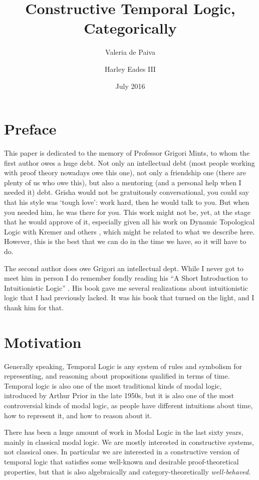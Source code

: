 \documentclass{article}
\title{Constructive Temporal Logic, Categorically}
\author{Valeria de Paiva \and Harley Eades III}
\date{July 2016}
\begin{document}
\maketitle

\section*{Preface}
This paper is dedicated to the memory of Professor Grigori Mints, to
whom the first author owes a huge debt. Not only an intellectual debt
(most people working with proof theory nowadays owe this one), not
only a friendship one (there are plenty of us who owe this), but also
a mentoring (and a personal help when I needed it) debt. Grisha would
not be gratuitously conversational, you could say that his style was
`tough love': work hard, then he would talk to you. But when you
needed him, he was there for you. This work might not be, yet, at the
stage that he would approve of it, especially given all his work on
Dynamic Topological Logic with Kremer and others \cite{kremer2005},
which might be related to what we describe here. However, this is the
best that we can do in the time we have, so it will have to do.

The second author does owe Grigori an intellectual dept.  While I
never got to meet him in person I do remember fondly reading his ``A
Short Introduction to Intuitionistic Logic'' \cite{Mints:2000}.  His
book gave me several realizations about intuitionistic logic that I
had previously lacked.  It was his book that turned on the light, and
I thank him for that.

\section{Motivation}
Generally speaking, Temporal Logic is any system of rules and
symbolism for representing, and reasoning about propositions qualified
in terms of time.  Temporal logic is also one of the most traditional
kinds of modal logic, introduced by Arthur Prior in the late 1950s,
but it is also one of the most controversial kinds of modal logic, as
people have different intuitions about time, how to represent it, and how to reason about it.

There has been a huge amount of work in Modal Logic in the last sixty
years, mainly in classical modal logic. We are mostly interested
in constructive systems, not classical ones. In particular we are interested in a
constructive version of temporal logic that satisfies some well-known
and desirable proof-theoretical properties, but that is also
algebraically and category-theoretically \textit{well-behaved}.
\end{document}
